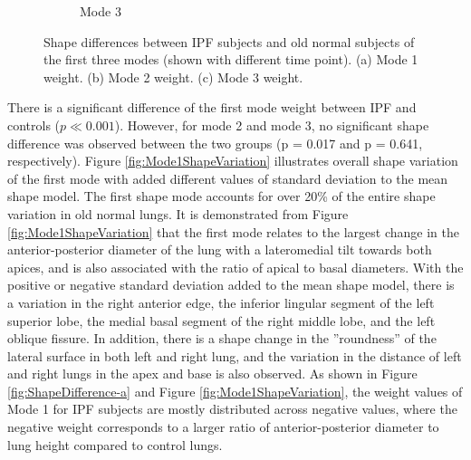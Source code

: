 \begin{figure}[htbp]
\begin{subfigure}{.65\linewidth}
  \caption{Mode 3}
  \label{fig:ShapeDifference-c}
\end{subfigure}
\caption{ Shape differences between IPF subjects and old normal subjects of the first three modes (shown with different time point). (a) Mode 1 weight. (b) Mode 2 weight. (c) Mode 3  weight.}
\label{fig:ShapeDifference}
\end{figure}


There is a significant difference of the first mode weight between IPF and controls ($p\ll 0.001$). However, for mode 2 and mode 3, no significant shape difference was observed between the two groups (p = 0.017 and p = 0.641, respectively). Figure \ref{fig:Mode1ShapeVariation} illustrates overall shape variation of the first mode with added different values of standard deviation to the mean shape model. The first shape mode accounts for over 20\% of the entire shape variation in old normal lungs. It is demonstrated from Figure \ref{fig:Mode1ShapeVariation} that the first mode relates to the largest change in the anterior-posterior diameter of the lung with a lateromedial tilt towards both apices, and is also associated with the ratio of apical to basal diameters. With the positive or negative standard deviation added to the mean shape model, there is a variation in the right anterior edge, the inferior lingular segment of the left superior lobe, the medial basal segment of the right middle lobe, and the left oblique fissure. In addition, there is a shape change in the ''roundness'' of the lateral surface in both left and right lung, and the variation in the distance of left and right lungs in the apex and base is also observed. As shown in Figure \ref{fig:ShapeDifference-a} and Figure \ref{fig:Mode1ShapeVariation}, the weight values of Mode 1 for IPF subjects are mostly distributed across negative values, where the negative weight corresponds to a larger ratio of anterior-posterior diameter to lung height compared to control lungs. 

